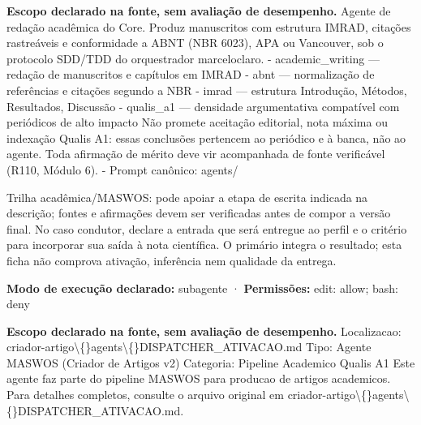 
\begin{descricao}
\textbf{Escopo declarado na fonte, sem avaliação de desempenho.}
Agente de redação acadêmica do Core. Produz manuscritos com estrutura IMRAD, citações rastreáveis e conformidade a ABNT (NBR 6023), APA ou Vancouver, sob o protocolo SDD/TDD do orquestrador marceloclaro. - academic\_writing — redação de manuscritos e capítulos em IMRAD - abnt — normalização de referências e citações segundo a NBR - imrad — estrutura Introdução, Métodos, Resultados, Discussão - qualis\_a1 — densidade argumentativa compatível com periódicos de alto impacto Não promete aceitação editorial, nota máxima ou indexação Qualis A1: essas conclusões pertencem ao periódico e à banca, não ao agente. Toda afirmação de mérito deve vir acompanhada de fonte verificável (R110, Módulo 6). - Prompt canônico: agents/
\end{descricao}

\begin{funcao}
Trilha acadêmica/MASWOS: pode apoiar a etapa de escrita indicada na descrição; fontes e afirmações devem ser verificadas antes de compor a versão final. No caso condutor, declare a entrada que será entregue ao perfil e o critério para incorporar sua saída à nota científica. O primário integra o resultado; esta ficha não comprova ativação, inferência nem qualidade da entrega.
\end{funcao}

\begin{arquitetura}
\textbf{Modo de execução declarado:} subagente · \textbf{Permissões:} edit: allow; bash: deny
\end{arquitetura}


\begin{descricao}
\textbf{Escopo declarado na fonte, sem avaliação de desempenho.}
Localizacao: criador-artigo\textbackslash\{\}agents\textbackslash\{\}DISPATCHER\_ATIVACAO.md Tipo: Agente MASWOS (Criador de Artigos v2) Categoria: Pipeline Academico Qualis A1 Este agente faz parte do pipeline MASWOS para producao de artigos academicos. Para detalhes completos, consulte o arquivo original em criador-artigo\textbackslash\{\}agents\textbackslash\{\}DISPATCHER\_ATIVACAO.md.
\end{descricao}

